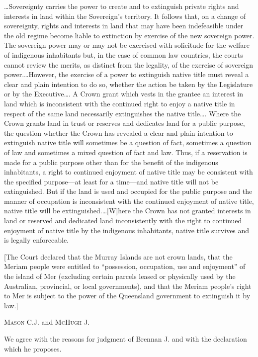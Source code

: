 \ldots Sovereignty carries the power to create and to extinguish private rights
and interests in land within the Sovereign's territory. It follows that, on a
change of sovereignty, rights and interests in land that may have been
indefeasible under the old regime become liable to extinction by exercise of the
new sovereign power. The sovereign power may or may not be exercised with
solicitude for the welfare of indigenous inhabitants but, in the case of common
law countries, the courts cannot review the merits, as distinct from the
legality, of the exercise of sovereign power.\ldots However, the exercise of a
power to extinguish native title must reveal a clear and plain intention to do
so, whether the action be taken by the Legislature or by the Executive\ldots . A
Crown grant which vests in the grantee an interest in land which is inconsistent
with the continued right to enjoy a native title in respect of the same land
necessarily extinguishes the native title\ldots . Where the Crown grants land in
trust or reserves and dedicates land for a public purpose, the question whether
the Crown has revealed a clear and plain intention to extinguish native title
will sometimes be a question of fact, sometimes a question of law and sometimes
a mixed question of fact and law. Thus, if a reservation is made for a public
purpose other than for the benefit of the indigenous inhabitants, a right to
continued enjoyment of native title may be consistent with the specified
purpose---at least for a time---and native title will not be extinguished. But
if the
land is used and occupied for the public purpose and the manner of occupation is
inconsistent with the continued enjoyment of native title, native title will be
extinguished.\ldots [W]here the Crown has not granted interests in land or
reserved and dedicated land inconsistently with the right to continued enjoyment
of native title by the indigenous inhabitants, native title survives and is
legally enforceable.

[The Court declared that the Murray Islands are not crown lands, that the Meriam
people were entitled to ``possession, occupation, use and enjoyment'' of the
island of Mer (excluding certain parcels leased or physically used by the
Australian, provincial, or local governments), and that the Meriam people's
right to Mer is subject to the power of the Queensland government to extinguish
it by law.]

\opinion \textsc{Mason} C.J. and \textsc{McHugh} J. 

We agree with the reasons for judgment of Brennan J. and with the declaration
which he proposes.

